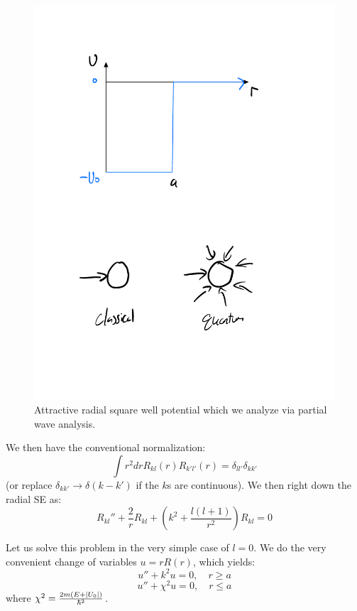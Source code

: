 \begin{figure}[htbp]
    \centering
    \includegraphics[scale=0.6]{Images/fig-squarewell.pdf}
    \caption{Attractive radial square well potential which we analyze via partial wave analysis.}
    \label{fig-squarewell}
\end{figure}

We then have the conventional normalization:
\begin{equation}
    \int r^2 dr R_{kl}(r)R_{k'l'}(r) = \delta_{ll'}\delta_{kk'}
\end{equation}
(or replace $\delta_{kk'} \to \delta(k-k')$ if the $k$s are continuous). We then right down the radial SE as:
\begin{equation}
    R_{kl}'' + \frac{2}{r}R_{kl} + \left(k^2 + \frac{l(l+1)}{r^2}\right)R_{kl} = 0
\end{equation}

Let us solve this problem in the very simple case of $l = 0$. We do the very convenient change of variables $u = rR(r)$, which yields:
\begin{equation}
    u'' + k^2 u = 0, \quad r \geq a
\end{equation}
\begin{equation}
    u'' + \chi^2 u = 0, \quad r \leq a
\end{equation}
where $\chi^2 = \frac{2m(E + \lvert U_0 \rvert)}{\hbar^2}$. 

